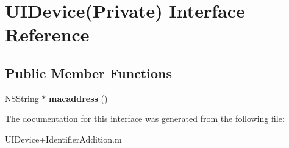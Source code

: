 \hypertarget{interface_u_i_device_07_private_08}{
\section{\-U\-I\-Device(\-Private) \-Interface \-Reference}
\label{interface_u_i_device_07_private_08}
}
\subsection*{\-Public \-Member \-Functions}
\begin{DoxyCompactItemize}
\item 
\hypertarget{interface_u_i_device_07_private_08_afc3c5fccb3a43f2af117558d25f95455}{
\hyperlink{class_n_s_string}{\-N\-S\-String} $\ast$ {\bfseries macaddress} ()}
\label{interface_u_i_device_07_private_08_afc3c5fccb3a43f2af117558d25f95455}

\end{DoxyCompactItemize}


\-The documentation for this interface was generated from the following file\-:\begin{DoxyCompactItemize}
\item 
\-U\-I\-Device+\-Identifier\-Addition.\-m\end{DoxyCompactItemize}
